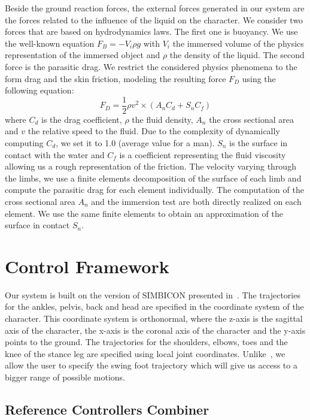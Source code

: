 \documentclass[runningheads,a4paper,10pt]{llncs}
\begin{document}
Beside the ground reaction forces, the external forces generated in our system are the forces related to the influence of the liquid on the character. We consider two forces that are based on hydrodynamics laws. The first one is buoyancy. We use the well-known equation $F_{B}=-V_i \rho g$ with $V_i$ the immersed volume of the physics representation of the immersed object and $\rho$ the density of the liquid. The second force is the parasitic drag. We restrict the considered physics phenomena to the form drag and the skin friction, modeling the resulting force $F_D$ using the following equation:
\begin{equation}
F_D=\frac{1}{2} \rho v^2 \times (A_n C_d + S_n C_f)
\end{equation}
where $C_d$ is the drag coefficient, $\rho$ the fluid density, $A_n$ the cross sectional area and $v$ the relative speed to the fluid. Due to the complexity of dynamically computing $C_d$, we set it to 1.0 (average value for a man). $S_n$ is the surface in contact with the water and $C_f$ is a coefficient representing the fluid viscosity allowing us a rough representation of the friction. The velocity varying through the limbs, we use a finite elements decomposition of the surface of each limb and compute the parasitic drag for each element individually. The computation of the cross sectional area $A_n$ and the immersion test are both directly realized on each element. We use the same finite elements to obtain an approximation of the surface in contact $S_n$.

\section{Control Framework}
\label{sec:control_framework}

Our system is built on the version of SIMBICON presented in~\citep{coros2010generalized}. The trajectories for the ankles, pelvis, back and head are specified in the coordinate system of the character. This coordinate system is orthonormal, where the z-axis is the sagittal axis of the character, the x-axis is the coronal axis of the character and the y-axis points to the ground. The trajectories for the shoulders, elbows, toes and the knee of the stance leg are specified using local joint coordinates. Unlike~\citep{coros2010generalized}, we allow the user to specify the swing foot trajectory which will give us access to a bigger range of possible motions. 


\subsection{Reference Controllers Combiner}
\label{sec:multi_state}
\end{document}
